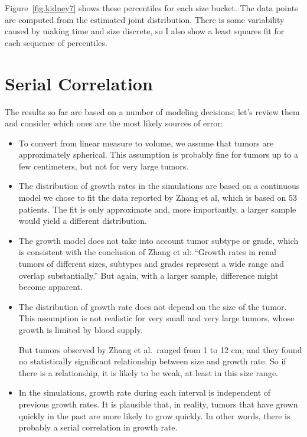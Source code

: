 \documentclass[12pt]{book}
\begin{document}
Figure~\ref{fig.kidney7} shows these percentiles for each
size bucket.  The data points are computed from the estimated
joint distribution.  There is some variability caused by making
time and size discrete, so I also show a least squares fit for
each sequence of percentiles.


\section{Serial Correlation}
\label{serial}

The results so far are based on a number of modeling decisions;
let's review them and consider which ones are the most
likely sources of error:

\begin{itemize}

\item To convert from linear measure to volume, we assume that
  tumors are approximately spherical.  This assumption is probably
  fine for tumors up to a few centimeters, but not for very
  large tumors.

\item The distribution of growth rates in the simulations are based on
  a continuous model we chose to fit the data reported by Zhang et al,
  which is based on 53 patients.  The fit is only approximate and, more
  importantly, a larger sample would yield a
  different distribution.

\item The growth model does not take into account tumor subtype or
  grade, which is consistent with the conclusion of Zhang et al:
  ``Growth rates in renal tumors of different sizes, subtypes and
  grades represent a wide range and overlap substantially.''
  But again, with a larger sample, difference might become apparent.

\item The distribution of growth rate does not depend on the size of
  the tumor.  This assumption is not realistic for very
  small and very large tumors, whose growth is limited by blood supply.

  But tumors observed by Zhang et al.~ranged from 1 to 12 cm, and they
  found no statistically significant relationship between
  size and growth rate.  So if there is a relationship, it is
  likely to be weak, at least in this size range.
  
\item In the simulations, growth rate during each interval is
  independent of previous growth rates.  It is plausible that, in
  reality, tumors that have grown quickly in the past are more likely
  to grow quickly.  In other words, there is probably
  a serial correlation in growth rate.

\end{itemize}
\end{document}
